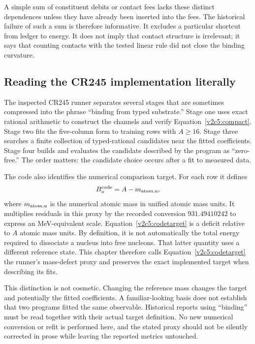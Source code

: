 A simple sum of constituent debits or contact fees lacks these distinct dependences unless they have already been inserted into the fees. The historical failure of such a sum is therefore informative. It excludes a particular shortcut from ledger to energy. It does not imply that contact structure is irrelevant; it says that counting contacts with the tested linear rule did not close the binding curvature.

\subsection{Reading the CR245 implementation literally}
\label{v2c5:runner}

The inspected CR245 runner separates several stages that are sometimes compressed into the phrase ``binding from typed substrate.'' Stage one uses exact rational arithmetic to construct the channels and verify Equation~\eqref{v2c5:compact}. Stage two fits the five-column form to training rows with $A\geq16$. Stage three searches a finite collection of typed-rational candidates near the fitted coefficients. Stage four builds and evaluates the candidate described by the program as ``zero-free.'' The order matters: the candidate choice occurs after a fit to measured data.\cite{viicr245}

The code also identifies the numerical comparison target. For each row it defines
\begin{equation}
 B_u^{\rm code}=A-m_{\rm atom,u},
 \label{v2c5:codetarget}
\end{equation}
where $m_{\rm atom,u}$ is the numerical atomic mass in unified atomic mass units. It multiplies residuals in this proxy by the recorded conversion $931.49410242$ to express an MeV-equivalent scale. Equation~\eqref{v2c5:codetarget} is a deficit relative to $A$ atomic mass units. By definition, it is not automatically the total energy required to dissociate a nucleus into free nucleons. That latter quantity uses a different reference state. This chapter therefore calls Equation~\eqref{v2c5:codetarget} the runner's mass-defect proxy and preserves the exact implemented target when describing its fits.

This distinction is not cosmetic. Changing the reference mass changes the target and potentially the fitted coefficients. A familiar-looking basis does not establish that two programs fitted the same observable. Historical reports using ``binding'' must be read together with their actual target definition. No new numerical conversion or refit is performed here, and the stated proxy should not be silently corrected in prose while leaving the reported metrics untouched.

